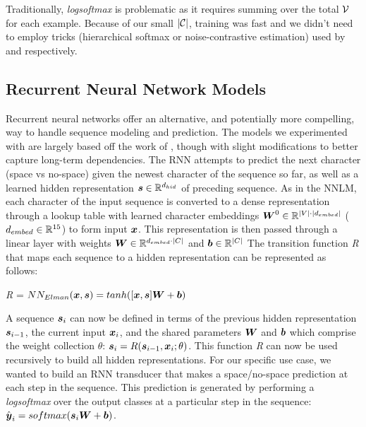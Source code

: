 \documentclass[11pt]{article}
\begin{document}
Traditionally, \textit{logsoftmax} is problematic as it requires summing over the total $\mathcal{V}$ for each example. Because of our small $|\mathcal{C}|$, training was fast and we didn't need to employ tricks (hierarchical softmax or noise-contrastive estimation) used by \citet{DBLP:journals/jmlr/BengioDVJ03} and \citet{mnih2013learning} respectively.

\subsection{Recurrent Neural Network Models}

Recurrent neural networks offer an alternative, and potentially more compelling, way to handle sequence modeling and prediction. The models we experimented with are largely based off the work of \citet{DBLP:journals/cogsci/Elman90}, though with slight modifications to better capture long-term dependencies. The RNN attempts to predict the next character (space vs no-space) given the newest character of the sequence so far, as well as a learned hidden representation $\boldsymbol{s} \in \mathbb{R}^{d_{hid}}$ of preceding sequence. As in the NNLM, each character of the input sequence is converted to a dense representation through a lookup table with learned character embeddings $\boldsymbol{W}^{0} \in \mathbb{R}^{|V| \cdot |d_{embed}|}$ ($d_{embed} \in \mathbb{R}^{15}$) to form input $\boldsymbol{x}$. This representation is then passed through a linear layer with weights $\boldsymbol{W} \in \mathbb{R}^{d_{embed} \cdot |C|}$ and $\boldsymbol{b} \in \mathbb{R}^{|C|}$ The transition function \textit{R} that maps each sequence to a hidden representation can be represented as follows:
\begin{center}
    \textit{R} = $NN_{Elman}(\boldsymbol{x}, \boldsymbol{s}) = tanh([\boldsymbol{x}, \boldsymbol{s}]\boldsymbol{W} + \boldsymbol{b})$
\end{center}

A sequence $\boldsymbol{s}_{i}$ can now be defined in terms of the previous hidden representation $\boldsymbol{s}_{i-1}$, the current input $\boldsymbol{x}_{i}$, and the shared parameters $\boldsymbol{W}$ and $\boldsymbol{b}$ which comprise the weight collection $\theta$: $\boldsymbol{s}_{i} = R(\boldsymbol{s}_{i-1},\boldsymbol{x}_{i};\theta)$.
This function \textit{R} can now be used recursively to build all hidden representations. For our specific use case, we wanted to build an RNN transducer that makes a space/no-space prediction at each step in the sequence. This prediction is generated by performing a \textit{logsoftmax} over the output classes at a particular step in the sequence: $\hat{\boldsymbol{y}}_{i} = softmax(\boldsymbol{s}_{i}\boldsymbol{W} + \boldsymbol{b})$.
\end{document}
